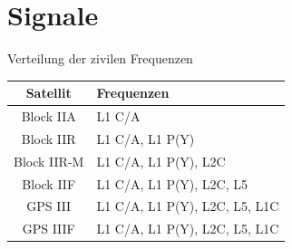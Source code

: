 \section{Signale}
\label{sec:signale}

\begin{frame}{Verteilung der zivilen Frequenzen}
    \begin{table}
        \begin{tabular}{c l}
            \toprule
            {Satellit} & {Frequenzen} \\
            \midrule
            Block IIA   & L1 C/A \\
            Block IIR   & L1 C/A, L1 P(Y) \\
            Block IIR-M & L1 C/A, L1 P(Y), L2C \\
            Block IIF   & L1 C/A, L1 P(Y), L2C, L5 \\
            GPS III     & L1 C/A, L1 P(Y), L2C, L5, L1C \\
            GPS IIIF    & L1 C/A, L1 P(Y), L2C, L5, L1C \\
            \bottomrule
        \end{tabular}
    \end{table}
\end{frame}

